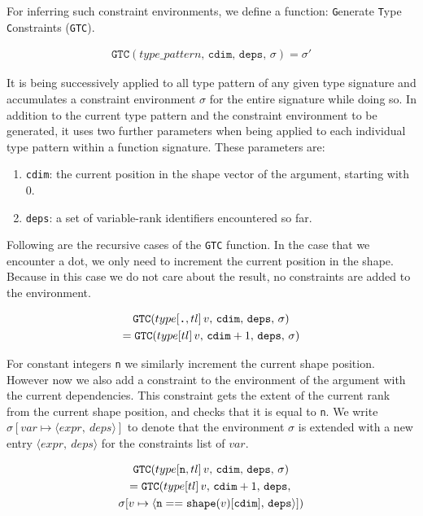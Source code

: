 \documentclass[sigconf,screen]{acmart}
\newcommand{\tpdot}{\texttt{\textbf{.}}}
\newcommand{\tpnum}{\texttt{n}}
\newcommand{\rest}{\ensuremath{tl}}
\newcommand{\gtc}[4]{\ensuremath{\texttt{GTC}(#1\,v,\,#2,\,#3,\,#4)}}
\newcommand{\cdim}{\texttt{cdim}}
\newcommand{\deps}{\texttt{deps}}
\newcommand{\cenv}{\ensuremath{\sigma{}}}
\newcommand{\envmap}[3]{\ensuremath{[#1\mapsto\langle{}#3,\,#2\rangle{}]}}
\begin{document}
For inferring such constraint environments, we define a function: \texttt{G}enerate \texttt{T}ype \texttt{C}onstraints (\texttt{GTC}).

\begin{gather*}
    \texttt{GTC}(type\_pattern,\, \cdim,\, \deps,\, \cenv) = \cenv'
\end{gather*}

It is being successively applied to all type pattern of any given type signature and accumulates a constraint environment \cenv{} for the entire signature while doing so.
In addition to the current type pattern and the constraint environment to be generated, it uses two further parameters when being applied to each individual type pattern within a function signature.
These parameters are:
\begin{enumerate}
  \item \cdim{}: the current position in the shape vector of the argument, starting with 0.
  \item \deps{}: a set of variable-rank identifiers encountered so far.
\end{enumerate}

Following are the recursive cases of the \texttt{GTC} function.
In the case that we encounter a dot, we only need to increment the current position in the shape.
Because in this case we do not care about the result, no constraints are added to the environment.

\begin{gather*}
    \gtc{type[\tpdot,\rest]}{\cdim}{\deps}{\cenv} \\
        = \gtc{type[\rest]}{\cdim+1}{\deps}{\cenv}
\end{gather*}

For constant integers \tpnum{} we similarly increment the current shape position.
However now we also add a constraint to the environment of the argument with the current dependencies.
This constraint gets the extent of the current rank from the current shape position, and checks that it is equal to \texttt{n}.
We write $\cenv[var \mapsto \langle{}expr,\ deps\rangle{}]$ to denote that the environment \cenv{} is extended with a new entry $\langle{}expr,\ deps\rangle{}$ for the constraints list of $var$.

{
\setlength\abovedisplayskip{0pt}
\begin{gather*}
    \gtc{type[\tpnum,\rest]}{\cdim}{\deps}{\cenv} \\
        = \gtc{type[\rest]}{\cdim+1}{\deps}{ \\ \cenv
            \envmap{v}{\deps}{\tpnum == \texttt{shape}(v)[\cdim]}}
\end{gather*}
}
\end{document}
